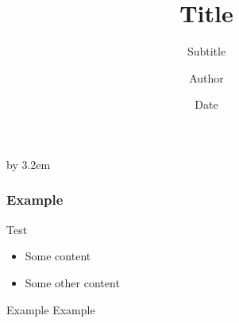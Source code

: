 \documentclass{beamer}
\begin{document}
\everymath{\displaystyle}



\title[Short title]{Title}
\subtitle[Short subtitle]{Subtitle}
\author[Short author]{Author}
\date[Short date]{Date}

\makeatletter
{}
\begin{frame}[plain,label=fp]
    \advance\textwidth by 3.2em\relax
    \begin{minipage}{\textwidth}\par%
      \maketitle
    \end{minipage}
    \hspace*{2.5em}%
\end{frame}
\makeatother 

\newcommand{\cfbox}[2]{%
\colorlet{currentcolor}{.}%
{\color{#1}%
\setlength{\fboxrule}{1mm}
\fbox{\color{currentcolor}#2}}%
}

\begin{frame}
    \frametitle{Example}

    \begin{block}{Test}
        \begin{itemize}
            \item Some content
            \item Some other content
        \end{itemize}
    \end{block}

    \begin{exampleblock}{Example}
        Example
    \end{exampleblock}
\end{frame}
\end{document}
